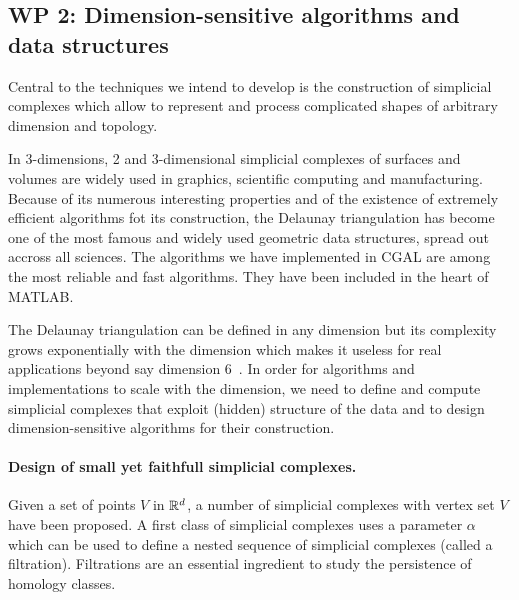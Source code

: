 \subsection*{WP 2:  Dimension-sensitive algorithms and data structures} 

Central to the techniques we intend to develop is the construction of simplicial complexes which
allow to represent and process complicated shapes of arbitrary dimension and topology.

In 3-dimensions, 2 and 3-dimensional simplicial complexes of surfaces and volumes are widely used in graphics, scientific computing and manufacturing. Because of its numerous interesting properties and of the existence of extremely efficient algorithms fot its construction, the Delaunay triangulation has become one of the most famous and widely used geometric data structures, spread out accross all sciences. The algorithms we have implemented in CGAL are among the most reliable and fast algorithms. They have been included in the heart of MATLAB. 

The Delaunay triangulation can be defined in any dimension but its complexity grows exponentially with the dimension which makes it useless for real applications beyond say dimension 6~\cite{avis,hornus}.  In order for algorithms and implementations to scale with the dimension, we need to define and compute simplicial complexes that exploit (hidden) structure of the data and to design dimension-sensitive algorithms for their construction.


\paragraph{Design of small yet faithfull simplicial complexes.} 
Given a set of points $V$ in $\mathbb R ^d$, a number of simplicial complexes with vertex set $V$ have been proposed. A first class of simplicial complexes uses a parameter $\alpha$ which can be used to define a nested sequence of simplicial complexes (called a filtration). Filtrations are an essential ingredient to study the persistence of homology classes. 

